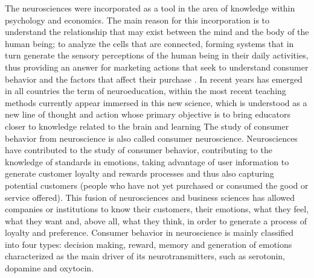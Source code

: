 \documentclass[english]{textolivre}
\begin{document}
The neurosciences were incorporated as a tool in the area of knowledge within psychology and economics. The main reason for this incorporation is to understand the relationship that may exist between the mind and the body of the human being; to analyze the cells that are connected, forming systems that in turn generate the sensory perceptions of the human being in their daily activities, thus providing an answer for marketing actions that seek to understand consumer behavior and the factors that affect their purchase \cite{malfitano_neuromarketing._2016}.  In recent years has emerged in all countries the term of neuroeducation, within the most recent teaching methods currently appear immersed in this new science, which is understood as a new line of thought and action whose primary objective is to bring educators closer to knowledge related to the brain and learning \cite{hernandez_relation_2020} The study of consumer behavior from neuroscience is also called consumer neuroscience. Neurosciences have contributed to the study of consumer behavior, contributing to the knowledge of standards in emotions, taking advantage of user information to generate customer loyalty and rewards processes and thus also capturing potential customers (people who have not yet purchased or consumed the good or service offered). This fusion of neurosciences and business sciences has allowed companies or institutions to know their customers, their emotions, what they feel, what they want and, above all, what they think, in order to generate a process of loyalty and preference. Consumer behavior in neuroscience is mainly classified into four types: decision making, reward, memory and generation of emotions \cite{solnais_contribution_2013} characterized as the main driver of its neurotransmitters, such as serotonin, dopamine and oxytocin.
\end{document}
